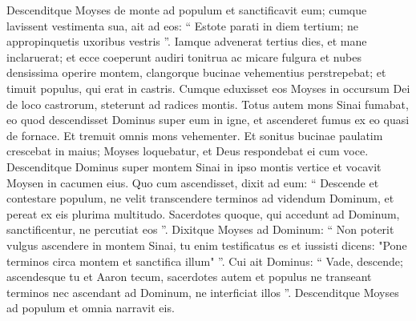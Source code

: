 \begin{biblechapter}
\begin{biblechapter}
\begin{biblechapter}
\begin{biblechapter}
\begin{biblechapter}
\begin{biblechapter}
\begin{biblechapter}
\begin{biblechapter}
\begin{biblechapter}
\begin{biblechapter}
\begin{biblechapter}
\begin{biblechapter}
\begin{biblechapter}
\begin{biblechapter}
\begin{biblechapter}
\begin{biblechapter}
\begin{biblechapter}
\begin{biblechapter}
\begin{biblechapter}
\verse Descenditque Moyses de monte ad populum et sanctificavit eum; cumque lavissent vestimenta sua, 
\verse ait ad eos: “ Estote parati in diem tertium; ne appropinquetis uxoribus vestris ”.
 \verse Iamque advenerat tertius dies, et mane inclaruerat; et ecce coeperunt audiri tonitrua ac micare fulgura et nubes densissima operire montem, clangorque bucinae vehementius perstrepebat; et timuit populus, qui erat in castris. 
\verse Cumque eduxisset eos Moyses in occursum Dei de loco castrorum, steterunt ad radices montis. 
\verse Totus autem mons Sinai fumabat, eo quod descendisset Dominus super eum in igne, et ascenderet fumus ex eo quasi de fornace. Et tremuit omnis mons vehementer. 
\verse Et sonitus bucinae paulatim crescebat in maius; Moyses loquebatur, et Deus respondebat ei cum voce.
 \verse Descenditque Dominus super montem Sinai in ipso montis vertice et vocavit Moysen in cacumen eius. Quo cum ascendisset, 
\verse dixit ad eum: “ Descende et contestare populum, ne velit transcendere terminos ad videndum Dominum, et pereat ex eis plurima multitudo. 
\verse Sacerdotes quoque, qui accedunt ad Dominum, sanctificentur, ne percutiat eos ”. 
\verse Dixitque Moyses ad Dominum: “ Non poterit vulgus ascendere in montem Sinai, tu enim testificatus es et iussisti dicens: "Pone terminos circa montem et sanctifica illum" ”. 
\verse Cui ait Dominus: “ Vade, descende; ascendesque tu et Aaron tecum, sacerdotes autem et populus ne transeant terminos nec ascendant ad Dominum, ne interficiat illos ”. 
\verse Descenditque Moyses ad populum et omnia narravit eis.
 

\end{biblechapter}
\end{biblechapter}
\end{biblechapter}
\end{biblechapter}
\end{biblechapter}
\end{biblechapter}
\end{biblechapter}
\end{biblechapter}
\end{biblechapter}
\end{biblechapter}
\end{biblechapter}
\end{biblechapter}
\end{biblechapter}
\end{biblechapter}
\end{biblechapter}
\end{biblechapter}
\end{biblechapter}
\end{biblechapter}
\end{biblechapter}
